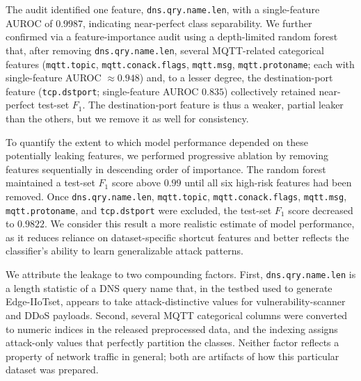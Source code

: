 \documentclass[pdflatex,sn-mathphys-num]{sn-jnl}
\theoremstyle{thmstyleone}
\theoremstyle{thmstyletwo}
\theoremstyle{thmstylethree}
\begin{document}
The audit identified one feature, \texttt{dns.qry.name.len}, with a single-feature AUROC of $0.9987$, indicating near-perfect class separability. We further confirmed via a feature-importance audit using a depth-limited random
forest that, after removing \texttt{dns.qry.name.len}, several MQTT-related
categorical features (\texttt{mqtt.topic}, \texttt{mqtt.conack.flags},
\texttt{mqtt.msg}, \texttt{mqtt.protoname}; each with single-feature
AUROC $\approx 0.948$) and, to a lesser degree, the destination-port feature
(\texttt{tcp.dstport}; single-feature AUROC $0.835$) collectively retained
near-perfect test-set $F_1$. The destination-port feature is thus a weaker,
partial leaker than the others, but we remove it as well for consistency.

To quantify the extent to which model performance depended on these potentially leaking features, we performed progressive ablation by removing features sequentially in descending order of importance. The random forest maintained a test-set $F_1$ score above $0.99$ until all six high-risk features had been removed. Once \texttt{dns.qry.name.len}, \texttt{mqtt.topic}, \texttt{mqtt.conack.flags}, \texttt{mqtt.msg}, \texttt{mqtt.protoname}, and \texttt{tcp.dstport} were excluded, the test-set $F_1$ score decreased to $0.9822$. We consider this result a more realistic estimate of model performance, as it reduces reliance on dataset-specific shortcut features and better reflects the classifier's ability to learn generalizable attack patterns.


We attribute the leakage to two compounding factors. First, \texttt{dns.qry.name.len} is a length statistic of a DNS query name that, in the testbed used to generate Edge-IIoTset, appears to take attack-distinctive values for vulnerability-scanner and DDoS payloads. Second, several MQTT categorical columns were converted to numeric indices in the released preprocessed data, and the indexing assigns attack-only values that perfectly partition the classes. Neither factor reflects a property of network traffic in general; both are artifacts of how this particular dataset was prepared.
\end{document}
